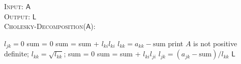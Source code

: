 \documentclass[10pt]{article}
\theoremstyle{definition}
\begin{document}
\begin{algorithm}[t]
\caption{Cholesky Decomposition}\label{alg:chol}
\hspace*{\algorithmicindent} {\scshape Input}: $\mathsf{A}$ \\
\hspace*{\algorithmicindent} {\scshape Output}: $\mathsf{L}$ \\
\hspace*{\algorithmicindent} {\scshape Cholesky-Decomposition}($\mathsf{A}$):
\begin{algorithmic}[1]
	   \State $l_{jk} = 0$
      \EndFor
\EndFor
{}
   	\State sum = $0$
   		\State sum = sum + $l_{ki}l_{ki}$
   	\EndFor
   	\State $l_{kk} = a_{kk}- \text{sum}$
   		\State print $A$ is not positive definite;
   		\State \Return
    \EndIf
   	\State $l_{kk} = \sqrt{l_{kk}}$;
       	\State sum = $0$
       		\State sum = sum + $l_{ki}l_{ji}$
       	\EndFor
       	\State $l_{jk}=(a_{jk}-\text{sum})/l_{kk}$
    \EndFor
\EndFor
\State \Return $\mathsf{L}$
\end{algorithmic}
\end{algorithm}
\end{document}
